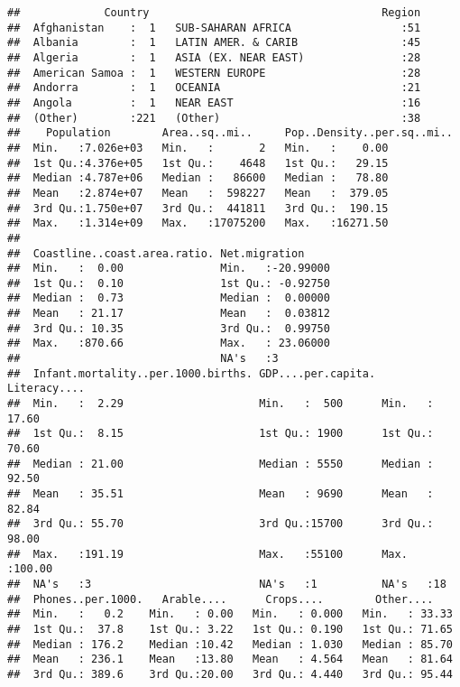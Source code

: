 \documentclass[]{article}
\begin{document}
\begin{verbatim}
##             Country                                    Region  
##  Afghanistan    :  1   SUB-SAHARAN AFRICA                 :51  
##  Albania        :  1   LATIN AMER. & CARIB                :45  
##  Algeria        :  1   ASIA (EX. NEAR EAST)               :28  
##  American Samoa :  1   WESTERN EUROPE                     :28  
##  Andorra        :  1   OCEANIA                            :21  
##  Angola         :  1   NEAR EAST                          :16  
##  (Other)        :221   (Other)                            :38  
##    Population        Area..sq..mi..     Pop..Density..per.sq..mi..
##  Min.   :7.026e+03   Min.   :       2   Min.   :    0.00          
##  1st Qu.:4.376e+05   1st Qu.:    4648   1st Qu.:   29.15          
##  Median :4.787e+06   Median :   86600   Median :   78.80          
##  Mean   :2.874e+07   Mean   :  598227   Mean   :  379.05          
##  3rd Qu.:1.750e+07   3rd Qu.:  441811   3rd Qu.:  190.15          
##  Max.   :1.314e+09   Max.   :17075200   Max.   :16271.50          
##                                                                   
##  Coastline..coast.area.ratio. Net.migration      
##  Min.   :  0.00               Min.   :-20.99000  
##  1st Qu.:  0.10               1st Qu.: -0.92750  
##  Median :  0.73               Median :  0.00000  
##  Mean   : 21.17               Mean   :  0.03812  
##  3rd Qu.: 10.35               3rd Qu.:  0.99750  
##  Max.   :870.66               Max.   : 23.06000  
##                               NA's   :3          
##  Infant.mortality..per.1000.births. GDP....per.capita.  Literacy....   
##  Min.   :  2.29                     Min.   :  500      Min.   : 17.60  
##  1st Qu.:  8.15                     1st Qu.: 1900      1st Qu.: 70.60  
##  Median : 21.00                     Median : 5550      Median : 92.50  
##  Mean   : 35.51                     Mean   : 9690      Mean   : 82.84  
##  3rd Qu.: 55.70                     3rd Qu.:15700      3rd Qu.: 98.00  
##  Max.   :191.19                     Max.   :55100      Max.   :100.00  
##  NA's   :3                          NA's   :1          NA's   :18      
##  Phones..per.1000.   Arable....      Crops....        Other....     
##  Min.   :   0.2    Min.   : 0.00   Min.   : 0.000   Min.   : 33.33  
##  1st Qu.:  37.8    1st Qu.: 3.22   1st Qu.: 0.190   1st Qu.: 71.65  
##  Median : 176.2    Median :10.42   Median : 1.030   Median : 85.70  
##  Mean   : 236.1    Mean   :13.80   Mean   : 4.564   Mean   : 81.64  
##  3rd Qu.: 389.6    3rd Qu.:20.00   3rd Qu.: 4.440   3rd Qu.: 95.44  

\end{verbatim}
\end{document}
